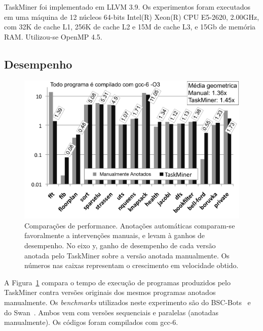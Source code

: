 \documentclass[sigplan,10pt,review]{acmart}
\newcommand\Taskminer{\mbox{\textsf{TaskMiner}}}
\begin{document}
{\Taskminer} foi implementado em LLVM 3.9. Os experimentos
foram executados em uma máquina de 12 núcleos 64-bits Intel(R) Xeon(R) CPU E5-2620, 2.00GHz, com 32K de cache L1, 256K de cache L2 e 15M de cache L3, e 15Gb de memória RAM. Utilizou-se OpenMP 4.5.

\subsection{Desempenho}
\label{sub:performance}

\begin{figure}[b!]
\begin{center}
\includegraphics[width=1\columnwidth]{images/TM_Performance}
\caption{Comparações de performance. Anotações automáticas comparam-se favoralmente a intervenções
manuais, e levam à ganhos de desempenho. No eixo y, ganho de desempenho de cada versão anotada
pelo {\Taskminer} sobre a versão anotada manualmente. Os números nas caixas representam
o crescimento em velocidade obtido.}
\label{fig:TM_Performance}
\end{center}
\end{figure}

A Figura~\ref{fig:TM_Performance} compara o tempo de execução de programas produzidos
pelo {\Taskminer} contra versões originais dos mesmos programas anotados manualmente.
Os {\em benchmarks} utilizados neste experimento são do \textsf{BSC-Bots}~\cite{Duran09} 
e do \textsf{Swan}~\cite{Moreira17}.
Ambos vem com versões sequenciais e paralelas (anotadas manualmente). Os códigos foram compilados
com gcc-6.
\end{document}
